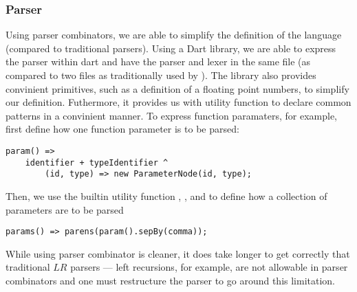 \subsubsection{Parser}

Using parser combinators, we are able to simplify the definition of 
	the language (compared to traditional  parsers).
Using a Dart library, we are able to express the parser within dart and
	have the parser and lexer in the same file (as compared to two
	files as traditionally used by ).
The library also provides convinient primitives, such as a definition of
	a floating point numbers, to simplify our definition.
Futhermore, it provides us with utility function to declare common patterns
	in a convinient manner.
To express function paramaters, for example, first define how one function
	parameter is to be parsed:

\begin{verbatim}
param() =>
	identifier + typeIdentifier ^
		(id, type) => new ParameterNode(id, type); 
\end{verbatim}

Then, we use the builtin utility function , ,
	and  to define how a collection of parameters are
	to be parsed

\begin{verbatim}
params() => parens(param().sepBy(comma));
\end{verbatim}

While using parser combinator is cleaner, it does take longer to get correctly
	that traditional $LR$ parsers --- left recursions, for example, are
	not allowable in parser combinators and one must restructure the parser
	to go around this limitation.
